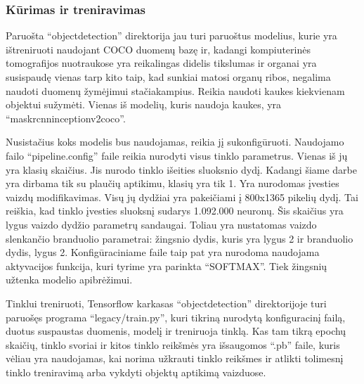 \documentclass{VUMIFInfKursinis}
\begin{document}
\subsubsection{Kūrimas ir treniravimas}
\par
Paruošta \enquote{object\textunderscore detection} direktorija jau turi paruoštus
modelius, kurie yra ištreniruoti naudojant COCO duomenų bazę ir, 
kadangi kompiuterinės tomografijos nuotraukose yra reikalingas
didelis tikslumas ir organai yra susispaudę vienas tarp kito taip, kad
sunkiai matosi organų ribos, negalima naudoti duomenų žymėjimui stačiakampius.
Reikia naudoti kaukes kiekvienam objektui sužymėti. Vienas iš modelių, kuris naudoja
kaukes, yra \enquote{mask\textunderscore rcnn\textunderscore inception\textunderscore v2\textunderscore coco}.
\par
Nusistačius koks modelis bus naudojamas, reikia jį sukonfigūruoti.
Naudojamo failo \enquote{pipeline.config} faile reikia nurodyti visus tinklo parametrus.
Vienas iš jų yra klasių skaičius. Jis nurodo tinklo išeities sluoksnio dydį.
Kadangi šiame darbe yra dirbama tik su plaučių aptikimu, klasių yra tik 1.
Yra nurodomas įvesties vaizdų modifikavimas. Visų jų dydžiai yra pakeičiami į
800x1365 pikelių dydį. Tai reiškia, kad tinklo įvesties sluoksnį sudarys
1.092.000 neuronų. Šis skaičius yra lygus vaizdo dydžio parametrų sandaugai.
Toliau yra nustatomas vaizdo slenkančio branduolio parametrai: žingsnio dydis, kuris yra lygus 2 ir
branduolio dydis, lygus 2. Konfigūraciniame faile taip pat yra nurodoma naudojama
aktyvacijos funkcija, kuri tyrime yra parinkta \enquote{SOFTMAX}.
Tiek žingsnių užtenka modelio apibrėžimui.
\par
Tinklui treniruoti, Tensorflow karkasas \enquote{object\textunderscore detection} direktorijoje
turi paruošęs programa \enquote{legacy/train.py}, kuri tikriną nurodytą
konfiguracinį failą, duotus suspaustas duomenis, modelį ir treniruoja tinklą.
Kas tam tikrą epochų skaičių, tinklo svoriai ir kitos tinklo reikšmės
yra išsaugomos \enquote{.pb} faile, kuris vėliau yra naudojamas, kai norima
užkrauti tinklo reikšmes ir atlikti tolimesnį tinklo treniravimą arba vykdyti
objektų aptikimą vaizduose.
\end{document}
